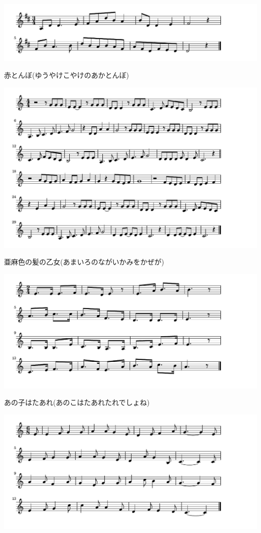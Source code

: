 \documentclass[a4paper]{ltjsarticle}
\begin{document}
\includegraphics[clip]{akatonbo_crop.pdf}

\vspace{-10mm} \hspace{10mm}
赤とんぼ(ゆうやけこやけのあかとんぼ)

\includegraphics[clip]{amaironokami_crop.pdf}

\vspace{-10mm} \hspace{10mm}
亜麻色の髪の乙女(あまいろのながいかみをかぜが)

\includegraphics[clip]{anokowatare_crop.pdf}

\vspace{-10mm} \hspace{10mm}
あの子はたあれ(あのこはたあれたれでしょね)

\includegraphics[clip]{aogeba_crop.pdf}
\end{document}
